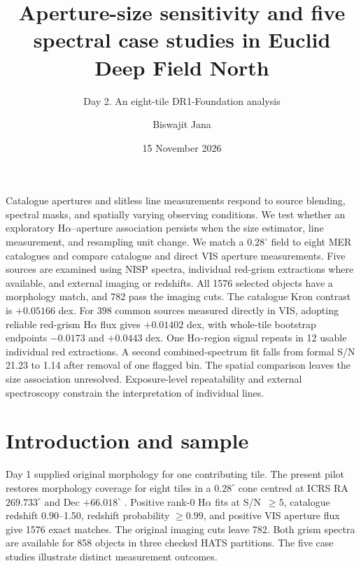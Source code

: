 \documentclass{aa}
\begin{document}
\title{Aperture-size sensitivity and five spectral case studies in Euclid Deep Field North}
\subtitle{Day 2. An eight-tile DR1-Foundation analysis}
\author{Biswajit Jana}
\date{15 November 2026}
\abstract
{Catalogue apertures and slitless line measurements respond to source blending, spectral masks, and spatially varying observing conditions.}
{We test whether an exploratory H$\alpha$--aperture association persists when the size estimator, line measurement, and resampling unit change.}
{We match a $0.28^{\circ}$ field to eight MER catalogues and compare catalogue and direct VIS aperture measurements. Five sources are examined using NISP spectra, individual red-grism extractions where available, and external imaging or redshifts.}
{All 1576 selected objects have a morphology match, and 782 pass the imaging cuts. The catalogue Kron contrast is $+0.05166$ dex. For 398 common sources measured directly in VIS, adopting reliable red-grism H$\alpha$ flux gives $+0.01402$ dex, with whole-tile bootstrap endpoints $-0.0173$ and $+0.0443$ dex. One H$\alpha$-region signal repeats in 12 usable individual red extractions. A second combined-spectrum fit falls from formal S/N 21.23 to 1.14 after removal of one flagged bin.}
{The spatial comparison leaves the size association unresolved. Exposure-level repeatability and external spectroscopy constrain the interpretation of individual lines.}
\maketitle
\section{Introduction and sample}
Day 1 supplied original morphology for one contributing tile. The present pilot restores morphology coverage for eight tiles in a $0.28^{\circ}$ cone centred at ICRS RA $269.733^{\circ}$ and Dec $+66.018^{\circ}$ \citep{aussel2026}. Positive rank-0 H$\alpha$ fits at S/N~$\geq5$, catalogue redshift 0.90--1.50, redshift probability $\geq0.99$, and positive VIS aperture flux give 1576 exact matches. The original imaging cuts leave 782. Both grism spectra are available for 858 objects in three checked HATS partitions. The five case studies illustrate distinct measurement outcomes.
\end{document}
